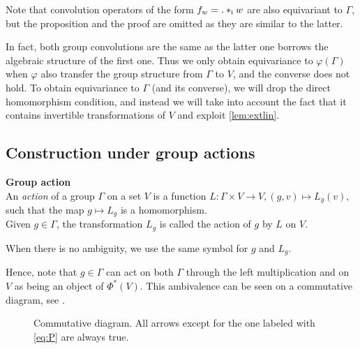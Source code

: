 \begin{remark}Note that convolution operators of the form $f_w = . \ast_{\operatorname{\textsc{i}}} w$ are also equivariant to $\Gamma$, but the proposition and the proof are omitted as they are similar to the latter.
\end{remark}

In fact, both group convolutions are the same as the latter one borrows the algebraic structure of the first one. Thus we only obtain equivariance to $\varphi(\Gamma)$ when $\varphi$ also transfer the group structure from $\Gamma$ to $V$, and the converse does not hold. To obtain equivariance to $\Gamma$ (and its converse), we will drop the direct homomorphism condition, and instead we will take into account the fact that it contains invertible transformations of $V$ and exploit \ref{lem:extlin}.

\subsection{Construction under group actions}
\label{sec:groupaction}

\begin{definition}\textbf{Group action}\\
An \emph{action} of a group $\Gamma$ on a set $V$ is a function $L: \Gamma \times V \rightarrow V, (g,v) \mapsto L_g(v)$, such that the map $g \mapsto L_g$ is a homomorphism.\\
Given $g \in \Gamma$, the transformation $L_g$ is called the action of $g$ by $L$ on $V$.
\end{definition}

\begin{remark}
When there is no ambiguity, we use the same symbol for $g$ and $L_g$. 
\end{remark}

Hence, note that $g \in \Gamma$ can act on both $\Gamma$ through the left multiplication and on $V$ as being an object of $\Phi^{*}(V)$. This ambivalence can be seen on a commutative diagram, see .%

\begin{figure}[H]
\centering
{}
\caption{Commutative diagram. All arrows except for the one labeled with \eqref{eq:P} are always true.}
\label{fig:com}
\end{figure}

